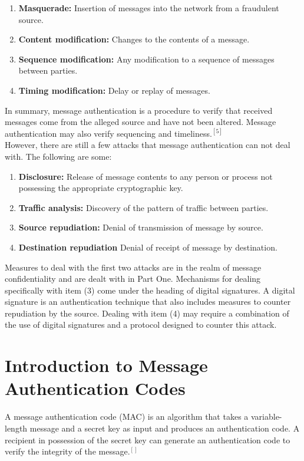 \documentclass[12pt,a4paper,oneside]{report}
\begin{document}
\begin{enumerate}[(1)]
    \item \textbf{Masquerade:} Insertion of messages into the network from a fraudulent source.
    \item \textbf{Content modification:} Changes to the contents of a message.
    \item \textbf{Sequence modification:} Any modification to a sequence of messages between
parties.
    \item \textbf{Timing modification:} Delay or replay of messages.
\end{enumerate}

In summary, message authentication is a procedure to verify that received messages come from the alleged source and have not been altered. Message authentication may also verify sequencing and timeliness.$^{[5]}$
\\

However, there are still a few attacks that message authentication can not deal with. The following are some:

\begin{enumerate}[(1)]
    \item \textbf{Disclosure:} Release of message contents to any person or process not possessing the appropriate cryptographic key.
    \item \textbf{Traffic analysis:} Discovery of the pattern of traffic between parties.
    \item \textbf{Source repudiation:} Denial of transmission of message by source.
    \item \textbf{Destination repudiation} Denial of receipt of message by destination.
\end{enumerate}

Measures to deal with the first two attacks are in the realm of message confidentiality and are dealt with in Part One. Mechanisms for dealing specifically with item (3) come under the heading of digital signatures. A digital signature is an
authentication technique that also includes measures to counter repudiation by the source. Dealing with item (4) may require a combination of the use of digital signatures and a protocol designed to counter this attack.


\section{Introduction to Message Authentication Codes}
A message authentication code (MAC) is an algorithm that takes a variable-length message and a secret key as input and produces an authentication code. A recipient in possession of the secret key can generate an authentication code to verify the integrity of the message.$^{[]}$
\end{document}
